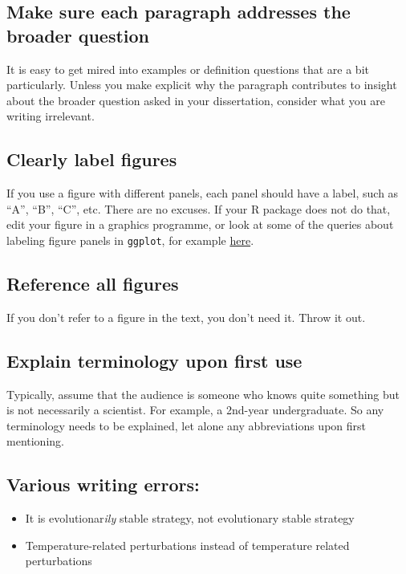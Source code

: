 \documentclass[
]{book}
\providecommand{\tightlist}{%
  \setlength{\itemsep}{0pt}\setlength{\parskip}{0pt}}
\begin{document}
\hypertarget{make-sure-each-paragraph-addresses-the-broader-question}{%
\subsection{Make sure each paragraph addresses the broader question}\label{make-sure-each-paragraph-addresses-the-broader-question}}

It is easy to get mired into examples or definition questions that are a bit particularly. Unless you
make explicit why the paragraph contributes to insight about the broader question
asked in your dissertation, consider what you are writing irrelevant.

\hypertarget{clearly-label-figures}{%
\subsection{Clearly label figures}\label{clearly-label-figures}}

If you use a figure with different panels, each panel should have a label, such
as ``A'', ``B'', ``C'', etc. There are no excuses. If your R package does not do that,
edit your figure in a graphics programme, or look at some of the queries about
labeling figure panels in \texttt{ggplot}, for example \href{https://stackoverflow.com/questions/17576381/label-individual-panels-in-a-multi-panel-ggplot2}{here}.

\hypertarget{reference-all-figures}{%
\subsection{Reference all figures}\label{reference-all-figures}}

If you don't refer to a figure in the text, you don't need it. Throw it out.

\hypertarget{explain-terminology-upon-first-use}{%
\subsection{Explain terminology upon first use}\label{explain-terminology-upon-first-use}}

Typically, assume that the audience is someone who knows quite something
but is not necessarily a scientist. For example, a 2nd-year undergraduate. So
any terminology needs to be explained, let alone any abbreviations upon first
mentioning.

\hypertarget{various-writing-errors}{%
\subsection{Various writing errors:}\label{various-writing-errors}}

\begin{itemize}
\tightlist
\item
  It is evolutionar\emph{ily} stable strategy, not evolutionary stable strategy
\item
  Temperature-related perturbations instead of temperature related perturbations
\end{itemize}

  
\end{document}
